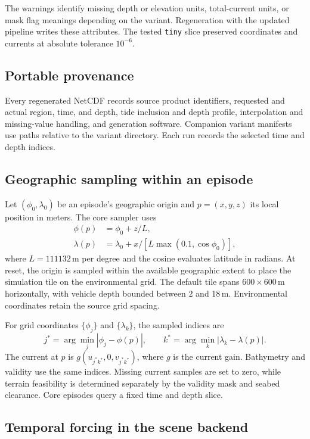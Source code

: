 The warnings identify missing depth or elevation units, total-current units, or mask flag meanings depending on the variant. Regeneration with the updated pipeline writes these attributes. The tested \texttt{tiny} slice preserved coordinates and currents at absolute tolerance $10^{-6}$.

\subsection{Portable provenance}

Every regenerated NetCDF records source product identifiers, requested and actual region, time, and depth, tide inclusion and depth profile, interpolation and missing-value handling, and generation software. Companion variant manifests use paths relative to the variant directory. Each run records the selected time and depth indices.

\subsection{Geographic sampling within an episode}

Let $(\phi_0,\lambda_0)$ be an episode's geographic origin and $p=(x,y,z)$ its local position in meters. The core sampler uses
\begin{align}
\phi(p)&=\phi_0+z/L,\\
\lambda(p)&=\lambda_0+x/[L\max(0.1,\cos\phi_0)],
\end{align}
where $L=111132$\,m per degree and the cosine evaluates latitude in radians. At reset, the origin is sampled within the available geographic extent to place the simulation tile on the environmental grid. The default tile spans $600\times600$\,m horizontally, with vehicle depth bounded between 2 and 18\,m. Environmental coordinates retain the source grid spacing.

For grid coordinates $\{\phi_j\}$ and $\{\lambda_k\}$, the sampled indices are
\begin{equation}
j^*=\arg\min_j|\phi_j-\phi(p)|,\qquad
k^*=\arg\min_k|\lambda_k-\lambda(p)|.
\end{equation}
The current at $p$ is $g(u_{j^*k^*},0,v_{j^*k^*})$, where $g$ is the current gain. Bathymetry and validity use the same indices. Missing current samples are set to zero, while terrain feasibility is determined separately by the validity mask and seabed clearance. Core episodes query a fixed time and depth slice.

\subsection{Temporal forcing in the scene backend}

